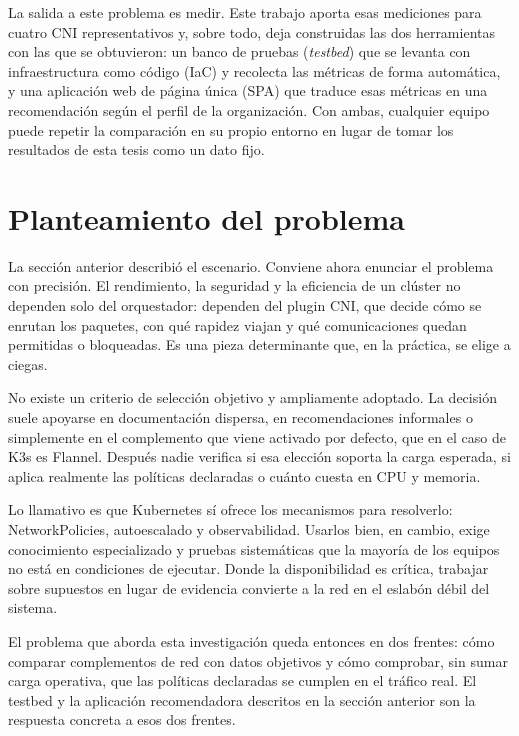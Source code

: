 La salida a este problema es medir. Este trabajo aporta esas mediciones para cuatro CNI representativos y, sobre todo, deja construidas las dos herramientas con las que se obtuvieron: un banco de pruebas (\emph{testbed}) que se levanta con infraestructura como código (IaC) y recolecta las métricas de forma automática, y una aplicación web de página única (SPA) que traduce esas métricas en una recomendación según el perfil de la organización. Con ambas, cualquier equipo puede repetir la comparación en su propio entorno en lugar de tomar los resultados de esta tesis como un dato fijo.

\section{Planteamiento del problema} \label{sec:Planteamiento}

La sección anterior describió el escenario. Conviene ahora enunciar el problema con precisión. El rendimiento, la seguridad y la eficiencia de un clúster no dependen solo del orquestador: dependen del plugin CNI, que decide cómo se enrutan los paquetes, con qué rapidez viajan y qué comunicaciones quedan permitidas o bloqueadas. Es una pieza determinante que, en la práctica, se elige a ciegas.

No existe un criterio de selección objetivo y ampliamente adoptado. La decisión suele apoyarse en documentación dispersa, en recomendaciones informales o simplemente en el complemento que viene activado por defecto, que en el caso de K3s es Flannel. Después nadie verifica si esa elección soporta la carga esperada, si aplica realmente las políticas declaradas o cuánto cuesta en CPU y memoria.

Lo llamativo es que Kubernetes sí ofrece los mecanismos para resolverlo: NetworkPolicies, autoescalado y observabilidad. Usarlos bien, en cambio, exige conocimiento especializado y pruebas sistemáticas que la mayoría de los equipos no está en condiciones de ejecutar. Donde la disponibilidad es crítica, trabajar sobre supuestos en lugar de evidencia convierte a la red en el eslabón débil del sistema.

El problema que aborda esta investigación queda entonces en dos frentes: cómo comparar complementos de red con datos objetivos y cómo comprobar, sin sumar carga operativa, que las políticas declaradas se cumplen en el tráfico real. El testbed y la aplicación recomendadora descritos en la sección anterior son la respuesta concreta a esos dos frentes.

